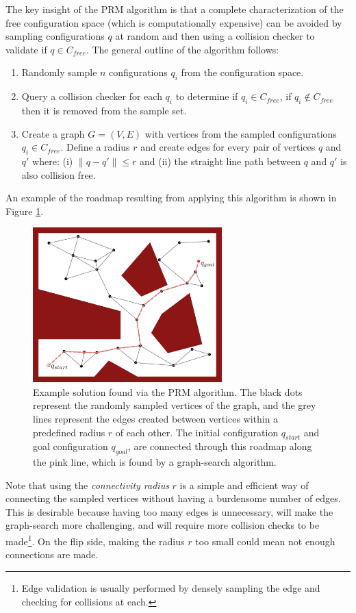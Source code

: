 The key insight of the PRM algorithm is that a complete characterization of the free configuration space (which is computationally expensive) can be avoided by sampling configurations $q$ at random and then using a collision checker to validate if $q \in C_{free}$. The general outline of the algorithm follows:
\begin{enumerate}
    \item Randomly sample $n$ configurations $q_i$ from the configuration space.
    \item Query a collision checker for each $q_i$ to determine if $q_i \in C_{free}$, if $q_i \not\in C_{free}$ then it is removed from the sample set.
    \item Create a graph $G = (V,E)$ with vertices from the sampled configurations $q_i \in C_{free}$. Define a radius $r$ and create edges for every pair of vertices $q$ and $q'$ where: (i) $\lVert q - q' \rVert \leq r$ and (ii) the straight line path between $q$ and $q'$ is also collision free.
\end{enumerate}
An example of the roadmap resulting from applying this algorithm is shown in Figure \ref{fig:prm-graph}.
\begin{figure}[ht]
  \centering
   \includegraphics[width=0.65\textwidth]{tex/figs/ch06_figs/prm.png}
  \caption{Example solution found via the PRM algorithm. The black dots represent the randomly sampled vertices of the graph, and the grey lines represent the edges created between vertices within a predefined radius $r$ of each other. The initial configuration $q_{start}$ and goal configuration $q_{goal}$, are connected through this roadmap along the pink line, which is found by a graph-search algorithm.}
  \label{fig:prm-graph}
\end{figure}
Note that using the \textit{connectivity radius} $r$ is a simple and efficient way of connecting the sampled vertices without having a burdensome number of edges. This is desirable because having too many edges is unnecessary, will make the graph-search more challenging, and will require more collision checks to be made\footnote{Edge validation is usually performed by densely sampling the edge and checking for collisions at each.}. On the flip side, making the radius $r$ too small could mean not enough connections are made.

